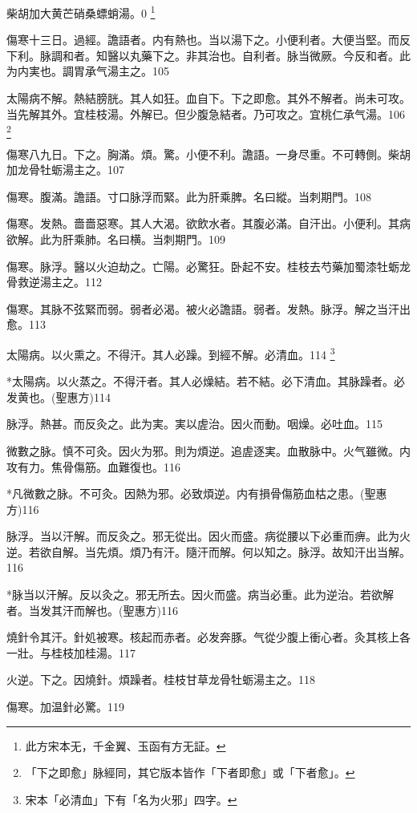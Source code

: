 \documentclass[b5paper,twoside,zihao=-4,UTF8]{ctexbook}
\begin{document}
柴胡加大黄芒硝桑螵蛸湯。0
	\footnote{此方宋本无，千金翼、玉函有方无証。}

傷寒十三日。過經。譫語者。内有熱也。当以湯下之。小便利者。大便当堅。而反{下}利。脉調和者。知醫以丸藥下之。非其治也。自利者。脉当微厥。今反和者。此为内実也。{調胃}承气湯主之。105

太陽病不解。熱結膀胱。其人如狂。血自下。下之即愈。其外不解者。尚未可攻。当先解其外。{宜桂枝湯。}外解已。{但}少腹急結者。乃可攻之。宜桃仁承气湯。106
	\footnote{「下之即愈」脉經同，其它版本皆作「下者即愈」或「下者愈」。}

傷寒八九日。下之。胸滿。煩。驚。小便不利。譫語。一身尽重。不可轉側。柴胡加龙骨牡蛎湯主之。107

傷寒。腹滿。譫語。寸口脉浮而緊。此为肝乘脾。名曰縱。当刺期門。108

傷寒。发熱。嗇嗇惡寒。其人大渴。欲飲水者。其腹必滿。自汗出。小便利。其病欲解。此为肝乘肺。名曰横。当刺期門。109

傷寒。脉浮。醫以火迫劫之。亡陽。{必}驚狂。卧起不安。桂枝去芍藥加蜀漆牡蛎龙骨救逆湯主之。112

傷寒。其脉不弦緊而弱{。弱}者必渴。被火必譫語。{弱者。发熱。脉浮。解之当汗出愈。}113

太陽病。以火熏之。不得汗。其人必躁。到經不解。必清血。114
	\footnote{宋本「必清血」下有「名为火邪」四字。}

*太陽病。以火蒸之。不得汗者。其人必燥結。若不結。必下清血。其脉躁者。必发黄也。(聖惠方)114

脉浮。熱甚。而反灸之。此为実。実以虗治。因火而動。咽燥。必吐血。115

微數之脉。慎不可灸。因火为邪。則为煩逆。追虗逐実。血散脉中。火气雖微。内攻有力。焦骨傷筋。血難復也。116

*凡微數之脉。不可灸。因熱为邪。必致煩逆。内有損骨傷筋血枯之患。(聖惠方)116

脉浮。当以汗解。而反灸之。邪无從出。因火而盛。病從腰以下必重而痹。此为火逆。若欲自解。当先煩。煩乃有汗。隨汗而解。何以知之。脉浮。故知汗出当解。116

*脉当以汗解。反以灸之。邪无所去。因火而盛。病当必重。此为逆治。若欲解者。当发其汗而解也。(聖惠方)116

燒針令其汗。針処被寒。核起而赤者。必发奔豚。气從少腹上衝心者。灸其核上各一壯。与桂枝加桂湯。117

火逆。下之。因燒針。煩躁者。桂枝甘草龙骨牡蛎湯主之。118

傷寒。加温針必驚。119
\end{document}
